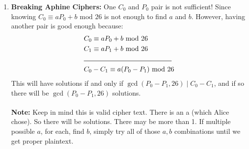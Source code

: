 \documentclass[class=article, crop=false]{standalone}
\begin{document}
\begin{enumerate}
	\item \textbf{Breaking Aphine Ciphers:} One $C_0$ and $P_0$ pair is not sufficient!
	Since knowing $C_0\equiv aP_0 + b\mbox{ mod }26$ is not enough to find $a$ and $b$.
	However, having another pair is good enough because:
	\begin{align*}
		&C_0 \equiv aP_0 + b \mbox{ mod } 26 \\
		&C_1 \equiv aP_1 + b \mbox{ mod } 26 \\
		&\rule{4.5cm}{.5pt} \\
		&C_0 - C_1 \equiv a(P_0 - P_1) \mbox{ mod }26
	\end{align*}
	This will have solutions if and only if $\gcd(P_0 - P_1, 26) \mid C_0 - C_1$, and if so
	there will be $\gcd(P_0-P_1, 26)$ solutions. \\\\
	\textbf{Note:} Keep in mind this is valid cipher text.
	There is an a (which Alice chose).
	So there will be solutions. There may be more than 1. If multiple possible $a$,
	for each, find $b$, simply try all of those $a,b$ combinations until we get proper plaintext.
\end{enumerate}

\end{document}
